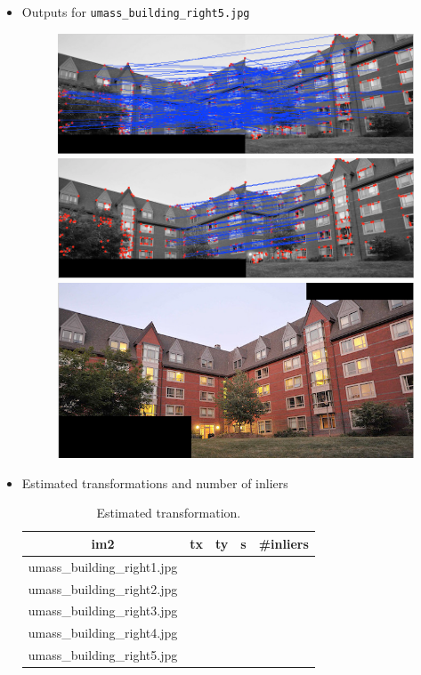 \documentclass[10pt,letterpaper]{article}
\newcommand{\cmd}[1] {{\color{blue}\texttt{#1}}}
\begin{document}
\begin{itemize}
\item Outputs for \cmd{umass\_building\_right5.jpg}
\begin{figure}[h]
\centering
\includegraphics[width=0.9\linewidth]{../latex/allmatches.png} \\
\includegraphics[width=0.9\linewidth]{../latex/inliers.png} \\
\includegraphics[width=0.9\linewidth]{../latex/result.png} \\
\end{figure}
\newpage

\item Estimated transformations and number of inliers
\begin{table}[h]
\centering
\begin{tabular}{c|c|c|c|c}
im2 & tx & ty & s & \#inliers\\
\hline
umass\_building\_right1.jpg & & & &\\
umass\_building\_right2.jpg & & & &\\
umass\_building\_right3.jpg & & & &\\
umass\_building\_right4.jpg & & & &\\
umass\_building\_right5.jpg & & & &\\
\end{tabular}
\caption{Estimated transformation.}
\end{table}

\end{itemize}
\end{document}

